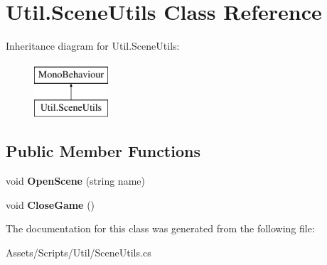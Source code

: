 \hypertarget{class_util_1_1_scene_utils}{}\section{Util.\+Scene\+Utils Class Reference}
\label{class_util_1_1_scene_utils}
Inheritance diagram for Util.\+Scene\+Utils\+:\begin{figure}[H]
\begin{center}
\leavevmode
\includegraphics[height=2.000000cm]{class_util_1_1_scene_utils}
\end{center}
\end{figure}
\subsection*{Public Member Functions}
\begin{DoxyCompactItemize}
\item 
void {\bfseries Open\+Scene} (string name)\hypertarget{class_util_1_1_scene_utils_af8e0c852c7dac53b86d44065e5efcdf1}{}\label{class_util_1_1_scene_utils_af8e0c852c7dac53b86d44065e5efcdf1}

\item 
void {\bfseries Close\+Game} ()\hypertarget{class_util_1_1_scene_utils_a51d4e2729e18eedf90b58c463577aa44}{}\label{class_util_1_1_scene_utils_a51d4e2729e18eedf90b58c463577aa44}

\end{DoxyCompactItemize}


The documentation for this class was generated from the following file\+:\begin{DoxyCompactItemize}
\item 
Assets/\+Scripts/\+Util/Scene\+Utils.\+cs\end{DoxyCompactItemize}
